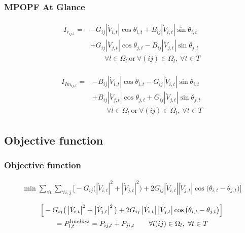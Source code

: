 \documentclass[
	11pt, %
	aspectratio=169, %
]{beamer}
\begin{document}
\begin{frame}
	\frametitle{MPOPF At Glance}
	
	\begin{align*}
		\begin{split}
			I_{r_{ij,t}} = &-G_{ij}\left\lvert \dot{V}_{i,t} \right\rvert \cos{\theta_{i,t}} + B_{ij}\left\lvert \dot{V}_{i,t} \right\rvert \sin{\theta_{i,t}} \\
					&+ G_{ij}\left\lvert \dot{V}_{j,t} \right\rvert \cos{\theta_{j,t}} - B_{ij}\left\lvert \dot{V}_{j,t} \right\rvert \sin{\theta_{j,t}} \\
			&\qquad \forall l \in \Omega_{l} \ \text{or} \ \forall (ij) \in \Omega_{l},\ \forall t \in T
		\end{split}
	\end{align*}

	\begin{align*}
		\begin{split}
			I_{Im_{ij,t}} = &-B_{ij}\left\lvert \dot{V}_{i,t} \right\rvert \cos{\theta_{i,t}} - G_{ij}\left\lvert \dot{V}_{i,t} \right\rvert \sin{\theta_{i,t}} \\
			&+ B_{ij}\left\lvert \dot{V}_{j,t} \right\rvert \cos{\theta_{j,t}} + G_{ij}\left\lvert \dot{V}_{j,t} \right\rvert \sin{\theta_{j,t}} \\
			&\qquad \forall l \in \Omega_{l} \ \text{or} \ \forall (ij) \in \Omega_{l},\ \forall t \in T
		\end{split}
	\end{align*}

\end{frame}

\subsection{Objective function}

\begin{frame}
	\frametitle{Objective function}
	\label{frame:MPOFP_objfunc}
	\begin{align}
	\label{eq:Mobj}
		\min \sum_{\forall t} \sum_{\forall i,j} \Big[ -G_{ij}\big(\left|\dot{V}_{i,t}\right|^2 + \left|\dot{V}_{j,t}\right|^2\big) + 2G_{ij}\left|\dot{V}_{i,t}\right|\left|\dot{V}_{j,t}\right|\cos\big(\theta_{i,t}-\theta_{j,t}\big) \Big]
	\end{align}

	\begin{align}
	\label{eq:Mexpr_loss}
		&\Big[ -G_{ij}\big(\left|\dot{V}_{i,t}\right|^2 + \left|\dot{V}_{j,t}\right|^2\big) + 2G_{ij}\left|\dot{V}_{i,t}\right|\left|\dot{V}_{j,t}\right|\cos\big(\theta_{i,t}-\theta_{j,t}\big) \Big] \notag \\
		&\qquad = P_{l,t}^{line loss} = P_{ij,t} + P_{ji,t} \qquad \forall l(ij) \in \Omega_{l},\ \forall t \in T
	\end{align}

\end{frame}
\end{document}
